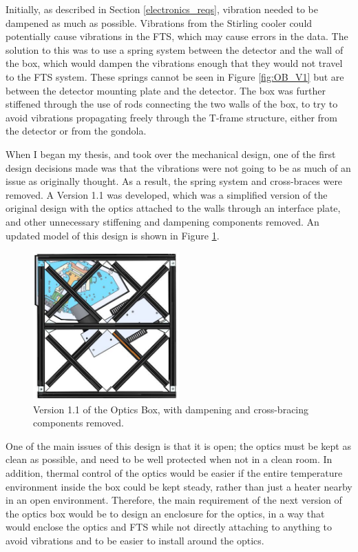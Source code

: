 Initially, as described in Section \ref{electronics_reqs}, vibration needed to be dampened as much as possible. Vibrations from the Stirling cooler could potentially cause vibrations in the FTS, which may cause errors in the data. The solution to this was to use a spring system between the detector and the wall of the box, which would dampen the vibrations enough that they would not travel to the FTS system. These springs cannot be seen in Figure \ref{fig:OB_V1} but are between the detector mounting plate and the detector. The box was further stiffened through the use of rods connecting the two walls of the box, to try to avoid vibrations propagating freely through the T-frame structure, either from the detector or from the gondola.

When I began my thesis, and took over the mechanical design, one of the first design decisions made was that the vibrations were not going to be as much of an issue as originally thought. As a result, the spring system and cross-braces were removed. A Version 1.1 was developed, which was a simplified version of the original design with the optics attached to the walls through an interface plate, and other unnecessary stiffening and dampening components removed. An updated model of this design is shown in Figure \ref{fig:OB_V1.1}.

\begin{figure}
    \centering
    \includegraphics[width=0.5\textwidth]{chap3_images/LIFE_V1_images/Optics_Box_V0_5_front_view.JPG}
    \caption{Version 1.1 of the Optics Box, with dampening and cross-bracing components removed.}
    \label{fig:OB_V1.1}
\end{figure}

One of the main issues of this design is that it is open; the optics must be kept as clean as possible, and need to be well protected when not in a clean room. In addition, thermal control of the optics would be easier if the entire temperature environment inside the box could be kept steady, rather than just a heater nearby in an open environment. Therefore, the main requirement of the next version of the optics box would be to design an enclosure for the optics, in a way that would enclose the optics and FTS while not directly attaching to anything to avoid vibrations and to be easier to install around the optics. 

